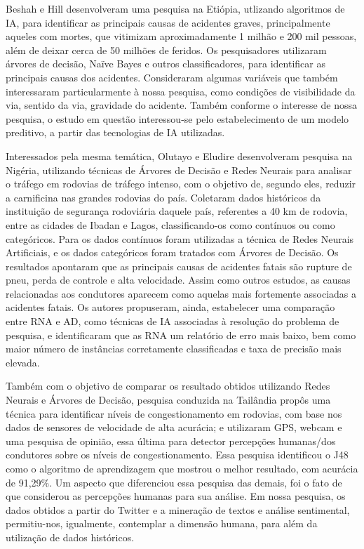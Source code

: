 Beshah e Hill \cite{beshah2010mining} desenvolveram uma pesquisa na Etiópia, utlizando algoritmos de IA, para identificar as principais causas de acidentes graves, principalmente aqueles com mortes, que vitimizam aproximadamente 1 milhão e 200 mil pessoas, além de deixar cerca de 50 milhões de feridos. Os pesquisadores utilizaram árvores de decisão, Naïve Bayes e outros classificadores, para identificar as principais causas dos acidentes. Consideraram algumas variáveis que também interessaram particularmente à nossa pesquisa, como condições de visibilidade da via, sentido da via, gravidade do acidente. Também conforme o interesse de nossa pesquisa, o estudo em questão interessou-se pelo estabelecimento de um modelo preditivo, a partir das tecnologias de IA utilizadas.

Interessados pela mesma temática, Olutayo e Eludire \cite{olutayo2014traffic} desenvolveram pesquisa na Nigéria, utilizando técnicas de Árvores de Decisão e Redes Neurais para analisar o tráfego em rodovias de tráfego intenso, com o objetivo de, segundo eles, reduzir a carnificina nas grandes rodovias do país. Coletaram dados históricos da instituição de segurança rodoviária daquele país, referentes a 40 km de rodovia, entre as cidades de Ibadan e Lagos, classificando-os como contínuos ou como categóricos. Para os dados contínuos foram utilizadas a técnica de Redes Neurais Artificiais, e os dados categóricos foram tratados com Árvores de Decisão. Os resultados apontaram que as principais causas de acidentes fatais são rupture de pneu, perda de controle e alta velocidade. Assim como outros estudos, as causas relacionadas aos condutores aparecem como aquelas mais fortemente associadas a acidentes fatais. Os autores propuseram, ainda, estabelecer uma comparação entre RNA e AD, como técnicas de IA associadas à resolução do problema de pesquisa, e identificaram que as RNA um relatório de erro mais baixo, bem como maior número de instâncias corretamente classificadas e taxa de precisão mais elevada.

Também com o objetivo de comparar os resultado obtidos utilizando Redes Neurais e Árvores de Decisão, pesquisa conduzida na Tailândia \cite{thianniwet2010classification} propôs uma técnica para identificar níveis de congestionamento em rodovias, com base nos dados de sensores de velocidade de alta acurácia; e utilizaram GPS, webcam e uma pesquisa de opinião, essa última para detector percepções humanas/dos condutores sobre os níveis de congestionamento. Essa pesquisa identificou o J48 como o algoritmo de aprendizagem que mostrou o melhor resultado, com acurácia de 91,29\%. Um aspecto que diferenciou essa pesquisa das demais, foi o fato de que considerou as percepções humanas para sua análise. Em nossa pesquisa, os dados obtidos a partir do Twitter e a mineração de textos e análise sentimental, permitiu-nos, igualmente, contemplar a dimensão humana, para além da utilização de dados históricos.

